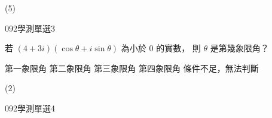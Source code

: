 \begin{QUESTIONS}
\begin{QUESTION}
\begin{QFROMS}
        \end{QFROMS}
        \begin{QTAGS}\end{QTAGS}
        \begin{QANS}
            (5)
        \end{QANS}
        \begin{QSOLLIST}
        \end{QSOLLIST}
        \begin{QEMPTYSPACE}
        \end{QEMPTYSPACE}
    \end{QUESTION}
    \begin{QUESTION}
        \begin{ExamInfo}{092}{學測}{單選}{3}
        \end{ExamInfo}
        \begin{ExamAnsRateInfo}{41}{66}{36}{21}
        \end{ExamAnsRateInfo}
        \begin{QBODY}
            若 $(4 + 3i)(\cos \theta + i \sin \theta )$ 為小於 0 的實數， 則 $\theta$ 是第幾象限角？ 
            \begin{QOPS} 
                \QOP 第一象限角 
                \QOP 第二象限角 
                \QOP 第三象限角 
                \QOP 第四象限角 
                \QOP 條件不足，無法判斷
            \end{QOPS}
        \end{QBODY}
        \begin{QFROMS}
        \end{QFROMS}
        \begin{QTAGS}\end{QTAGS}
        \begin{QANS}
            (2)
        \end{QANS}
        \begin{QSOLLIST}
        \end{QSOLLIST}
        \begin{QEMPTYSPACE}
        \end{QEMPTYSPACE}
    \end{QUESTION}
    \begin{QUESTION}
        \begin{ExamInfo}{092}{學測}{單選}{4}
        \end{ExamInfo}
        \begin{ExamAnsRateInfo}{49}{69}{47}{31}
        \end{ExamAnsRateInfo}

\end{QUESTION}
\end{QUESTIONS}
